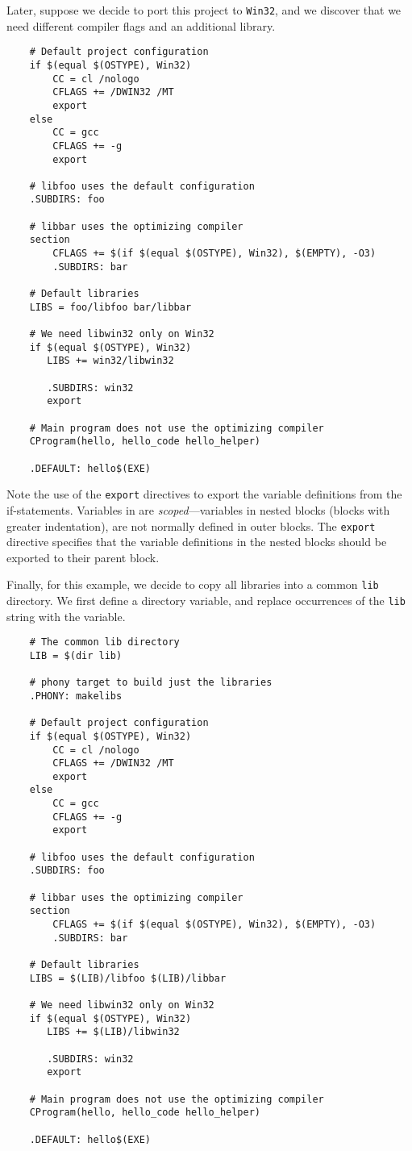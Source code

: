 Later, suppose we decide to port this project to \verb+Win32+, and we discover that we need
different compiler flags and an additional library.

\begin{verbatim}
    # Default project configuration
    if $(equal $(OSTYPE), Win32)
        CC = cl /nologo
        CFLAGS += /DWIN32 /MT
        export
    else
        CC = gcc
        CFLAGS += -g
        export

    # libfoo uses the default configuration
    .SUBDIRS: foo

    # libbar uses the optimizing compiler
    section
        CFLAGS += $(if $(equal $(OSTYPE), Win32), $(EMPTY), -O3)
        .SUBDIRS: bar

    # Default libraries
    LIBS = foo/libfoo bar/libbar

    # We need libwin32 only on Win32
    if $(equal $(OSTYPE), Win32)
       LIBS += win32/libwin32

       .SUBDIRS: win32
       export

    # Main program does not use the optimizing compiler
    CProgram(hello, hello_code hello_helper)

    .DEFAULT: hello$(EXE)
\end{verbatim}

Note the use of the \verb+export+ directives to export the variable definitions from the
if-statements.  Variables in  are \emph{scoped}---variables in nested blocks (blocks
with greater indentation), are not normally defined in outer blocks.  The \verb+export+ directive
specifies that the variable definitions in the nested blocks should be exported to their parent
block.

Finally, for this example, we decide to copy all libraries into a common \verb+lib+ directory.  We
first define a directory variable, and replace occurrences of the \verb+lib+ string with the
variable.

\begin{verbatim}
    # The common lib directory
    LIB = $(dir lib)

    # phony target to build just the libraries
    .PHONY: makelibs

    # Default project configuration
    if $(equal $(OSTYPE), Win32)
        CC = cl /nologo
        CFLAGS += /DWIN32 /MT
        export
    else
        CC = gcc
        CFLAGS += -g
        export

    # libfoo uses the default configuration
    .SUBDIRS: foo

    # libbar uses the optimizing compiler
    section
        CFLAGS += $(if $(equal $(OSTYPE), Win32), $(EMPTY), -O3)
        .SUBDIRS: bar

    # Default libraries
    LIBS = $(LIB)/libfoo $(LIB)/libbar

    # We need libwin32 only on Win32
    if $(equal $(OSTYPE), Win32)
       LIBS += $(LIB)/libwin32

       .SUBDIRS: win32
       export

    # Main program does not use the optimizing compiler
    CProgram(hello, hello_code hello_helper)

    .DEFAULT: hello$(EXE)
\end{verbatim}

